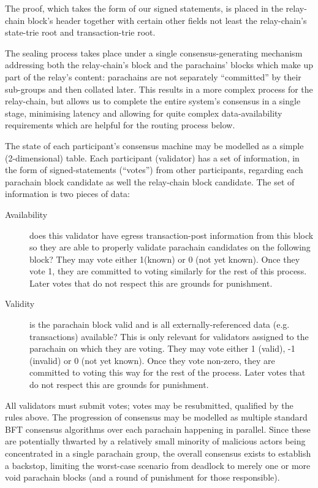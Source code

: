 \documentclass[9pt,oneside]{amsart}
\begin{document}
\begin{multicols}{2}
 The proof, which takes the form of our signed statements, is placed in the relay-chain block's header together with certain other fields not least the relay-chain's state-trie root and transaction-trie root.

 The sealing process takes place under a single consensus-generating mechanism addressing both the relay-chain's block and the parachains' blocks which make up part of the relay's content: parachains are not separately ``committed'' by their sub-groups and then collated later. This results in a more complex process for the relay-chain, but allows us to complete the entire system's consensus in a single stage, minimising latency and allowing for quite complex data-availability requirements which are helpful for the routing process below.
 

 The state of each participant's consensus machine may be modelled as a simple (2-dimensional) table. Each participant (validator) has a set of information, in the form of signed-statements (``votes'') from other participants, regarding each parachain block candidate as well the relay-chain block candidate. The set of information is two pieces of data:

\begin{description}
\item[Availability] does this validator have egress transaction-post information from this block so they are able to properly validate parachain candidates on the following block? They may vote either 1(known) or 0 (not yet known). Once they vote 1, they are committed to voting similarly for the rest of this process. Later votes that do not respect this are grounds for punishment.
\item[Validity] is the parachain block valid and is all externally-referenced data (e.g. transactions) available? This is only relevant for validators assigned to the parachain on which they are voting. They may vote either 1 (valid), -1 (invalid) or 0 (not yet known). Once they vote non-zero, they are committed to voting this way for the rest of the process. Later votes that do not respect this are grounds for punishment.
\end{description}

 All validators must submit votes; votes may be resubmitted, qualified by the rules above. The progression of consensus may be modelled as multiple standard BFT consensus algorithms over each parachain happening in parallel. Since these are potentially thwarted by a relatively small minority of malicious actors being concentrated in a single parachain group, the overall consensus exists to establish a backstop, limiting the worst-case scenario from deadlock to merely one or more void parachain blocks (and a round of punishment for those responsible).


\end{multicols}
\end{document}
